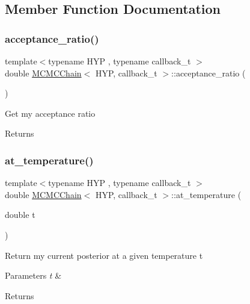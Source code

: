 \subsection{Member Function Documentation}
\mbox{\label{class_m_c_m_c_chain_a4b2b8b51e5ba868bca024f2be737e4c6}} 
\subsubsection{\texorpdfstring{acceptance\+\_\+ratio()}{acceptance\_ratio()}}
{\footnotesize\ttfamily template$<$typename H\+YP , typename callback\+\_\+t $>$ \\
double \hyperlink{class_m_c_m_c_chain}{M\+C\+M\+C\+Chain}$<$ H\+YP, callback\+\_\+t $>$\+::acceptance\+\_\+ratio (\begin{DoxyParamCaption}{ }\end{DoxyParamCaption})\hspace{0.3cm}{\ttfamily [inline]}}

Get my acceptance ratio \begin{DoxyReturn}{Returns}

\end{DoxyReturn}
\mbox{\label{class_m_c_m_c_chain_a9adc3d08662ad7035cc9d9d75a1fc5a6}} 
\subsubsection{\texorpdfstring{at\+\_\+temperature()}{at\_temperature()}}
{\footnotesize\ttfamily template$<$typename H\+YP , typename callback\+\_\+t $>$ \\
double \hyperlink{class_m_c_m_c_chain}{M\+C\+M\+C\+Chain}$<$ H\+YP, callback\+\_\+t $>$\+::at\+\_\+temperature (\begin{DoxyParamCaption}\item[{double}]{t }\end{DoxyParamCaption})\hspace{0.3cm}{\ttfamily [inline]}}

Return my current posterior at a given temperature t 
\begin{DoxyParams}{Parameters}
{\em t} & \\
\hline
\end{DoxyParams}
\begin{DoxyReturn}{Returns}

\end{DoxyReturn}
\mbox{\label{class_m_c_m_c_chain_ae76c66b5bcbc02df926e5f9a91acff17}} 
